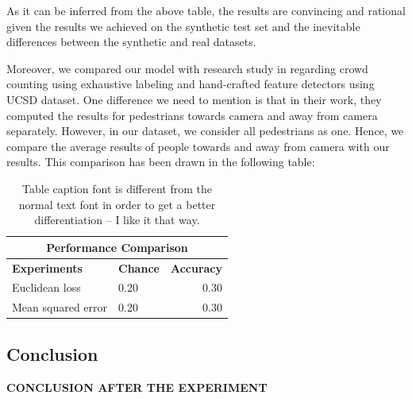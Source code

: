 As it can be inferred from the above table, the results are convincing and rational given the results we achieved on the synthetic test set and 
the inevitable differences between the synthetic and real datasets.


\noindent Moreover, we compared our model with \citeauthor*{chan2008privacy} research study in \cite{chan2008privacy} regarding crowd counting using exhaustive labeling and hand-crafted feature detectors using UCSD dataset. One difference we need to mention is that in their work, they computed the results for pedestrians towards camera and away from camera separately. However, in our dataset, we consider all pedestrians as one. Hence, we compare the average results of people towards and away from camera with our results. This comparison has been drawn in the following table:

\begin{table}[H]
\centering
\small\sffamily
\begin{tabular}{llr}
\multicolumn{3}{c}{\textbf{\textbf{Performance Comparison}}} \\
\bottomrule
\textbf{Experiments}  & \textbf{Chance} & \textbf{Accuracy} \\
\bottomrule
Euclidean loss           & 0.20 & 0.30 \\
Mean squared error       & 0.20 & 0.30 \\

\bottomrule
\end{tabular}
\caption{Table caption font is different from the normal text font in order to get a better differentiation -- I like it that way.}
\label{tab:realcomp}
\end{table} 

\subsection{Conclusion}

\textbf{CONCLUSION AFTER THE EXPERIMENT}

